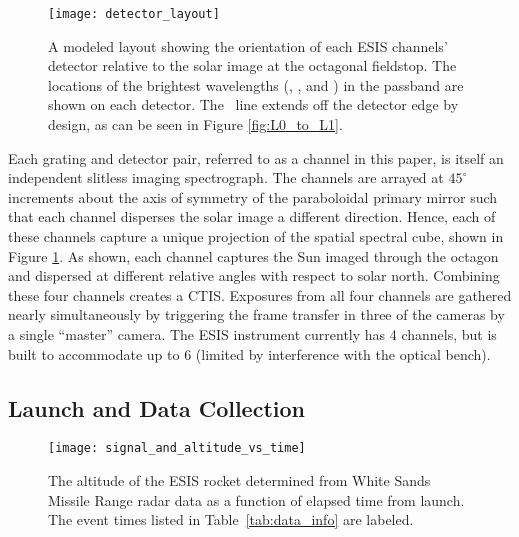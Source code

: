         \begin{figure}
			\begin{center}
				\texttt{[image: detector\_layout]}
				\caption{A modeled layout showing the orientation of each ESIS channels' detector relative to the solar image at the octagonal fieldstop.  The locations of the brightest wavelengths (\hei, \mgxbright, and \ov) in the passband are shown on each detector.  The \hei \ line  extends off the detector edge by design, as can be seen in Figure \ref{fig:L0_to_L1}. }
				\label{fig:level_1_array}
			\end{center}
		\end{figure}

    	Each grating and detector pair, referred to as a channel in this paper,
    	is itself an independent slitless imaging spectrograph.  
    	The channels are arrayed at $45^{\circ}$ increments about the axis of symmetry of the paraboloidal primary mirror such that each channel disperses the solar image a different direction. 
    	Hence, each of these channels capture a unique projection of the spatial spectral cube, shown in Figure \ref{fig:level_1_array}. 
    	As shown, each channel captures the Sun imaged through the octagon and dispersed at different relative angles with respect to solar north. Combining these four channels creates a CTIS. 
    	Exposures from all four channels are gathered nearly simultaneously by triggering the frame transfer in three of the cameras by a single ``master'' camera. 
    	The ESIS instrument currently has 4 channels, but is built to accommodate up to 6 (limited by interference with the optical bench).

    
	\subsection{Launch and Data Collection} 
		\begin{figure}
			\begin{center}
				\texttt{[image: signal\_and\_altitude\_vs\_time]}
				\caption{The altitude of the ESIS rocket determined from White Sands Missile Range radar data as a function of elapsed time from launch.  The event times listed in Table~\ref{tab:data_info} are labeled.}
				\label{fig:timeline}
			\end{center}
		\end{figure}

